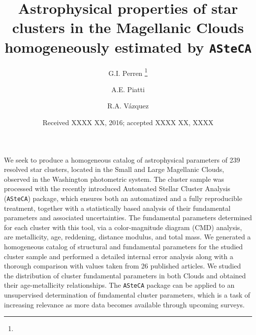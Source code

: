 \documentclass{aa}
\begin{document}
\title{Astrophysical properties of star clusters in the Magellanic Clouds
homogeneously estimated by \texttt{ASteCA}}
\subtitle{}

   \author{G.I. Perren
          \thanks{}
          \and
          A.E. Piatti
          \and
          R.A. V\'azquez
          }


   \date{Received XXXX XX, 2016; accepted XXXX XX, XXXX}

 
\abstract
{}
{We seek to produce a homogeneous catalog of astrophysical parameters of 239
resolved star clusters, located in the Small and Large Magellanic Clouds,
observed in the Washington photometric system.}
{The cluster sample was processed with the recently introduced Automated
Stellar Cluster Analysis (\texttt{ASteCA}) package, which ensures both an
automatized and a fully reproducible treatment, together with a statistically
based analysis of their fundamental parameters and associated uncertainties.
%
The fundamental parameters determined for each cluster with this tool, via a
color-magnitude diagram (CMD) analysis, are metallicity, age, reddening,
distance modulus, and total mass.}
{We generated a homogeneous catalog of structural and fundamental parameters
for the studied cluster sample and performed a detailed internal error analysis
along with a thorough comparison with values taken from 26 published
articles.
We studied the distribution of cluster fundamental parameters in both Clouds
and obtained their age-metallicity relationships.}
{The \texttt{ASteCA} package can be applied to an unsupervised determination of
fundamental cluster parameters, which is a task of increasing relevance as more
data becomes available through upcoming surveys.}

\end{document}
